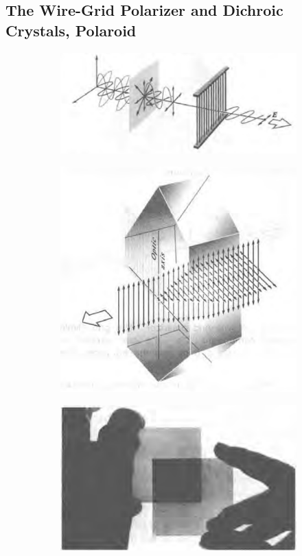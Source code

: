 \subsection{The Wire-Grid Polarizer and Dichroic Crystals, Polaroid}

\begin{figure}[H]
  \centering
  \begin{subfigure}{.35\textwidth}
    \centering
    \includegraphics[width=\linewidth]{figures/WireGrid}
    \label{fig:}
  \end{subfigure}
  \begin{subfigure}{.17\textwidth}
    \centering
    \includegraphics[width=\linewidth]{figures/Dichroic-Crystals}
    \label{fig:}
  \end{subfigure}
  \label{fig:}
  \begin{subfigure}{.4\textwidth}
    \centering
    \includegraphics[width=0.6\linewidth]{figures/Polaroid}
    \label{fig:}
  \end{subfigure}
  \label{fig:}
\end{figure}



